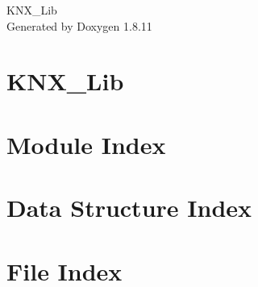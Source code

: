 \documentclass[twoside]{book}
\newcommand{\+}{\discretionary{\mbox{\scriptsize$\hookleftarrow$}}{}{}}
\newcommand{\clearemptydoublepage}{%
  \newpage{\pagestyle{empty}\cleardoublepage}%
}
\begin{document}
\hypersetup{pageanchor=false,
             bookmarksnumbered=true,
             pdfencoding=unicode
            }
\begin{titlepage}
\vspace*{7cm}
\begin{center}%
{\Large K\+N\+X\+\_\+\+Lib }\\
\vspace*{1cm}
{\large Generated by Doxygen 1.8.11}\\
\end{center}
\end{titlepage}
\clearemptydoublepage
\tableofcontents
\clearemptydoublepage
{}
\hypersetup{pageanchor=true}

\chapter{K\+N\+X\+\_\+\+Lib}
\label{md_README}
\hypertarget{md_README}{}

\chapter{Module Index}

\chapter{Data Structure Index}

\chapter{File Index}

\end{document}
